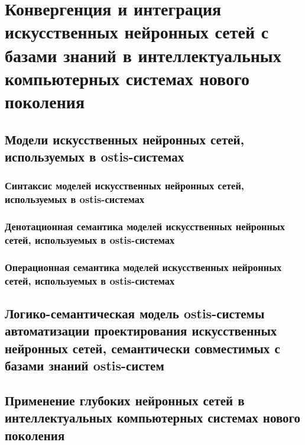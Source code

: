 \chapter{Конвергенция и интеграция искусственных нейронных сетей с базами знаний в интеллектуальных компьютерных системах нового поколения}
\label{chapter_ann}


\section{Модели искусственных нейронных сетей, используемых в ostis-системах}
\subsection{Синтаксис моделей искусственных нейронных сетей, используемых в ostis-системах}
\subsection{Денотационная семантика моделей искусственных нейронных сетей, используемых в ostis-системах}
\subsection{Операционная семантика моделей искусственных нейронных сетей, используемых в ostis-системах}
\section{Логико-семантическая модель ostis-системы автоматизации проектирования искусственных нейронных сетей, семантически совместимых с базами знаний ostis-систем}
\section{Применение глубоких нейронных сетей в интеллектуальных компьютерных системах нового поколения}

%